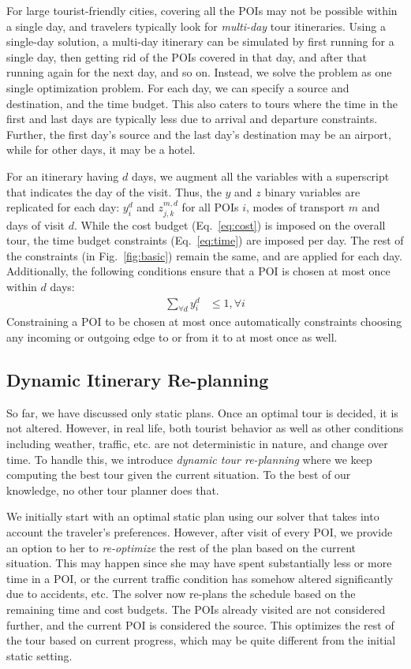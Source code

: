 For large tourist-friendly cities, covering all the POIs may not be
possible within a single day, and travelers typically look for
\emph{multi-day} tour itineraries.
Using a single-day solution, a multi-day itinerary can be simulated
by first
running for a single day, then getting rid of the POIs covered in that day, and
after that running again for the next day, and so on.
Instead, we solve the
problem as one single optimization problem.  For each day, we can specify a
source and destination, and the time budget.  This also caters to tours where
the time in the first and last days are typically less due to arrival and
departure constraints.  Further, the first day's source and the last day's
destination may be an airport, while for other days, it
may be a hotel.

For an itinerary having $d$ days, we augment all the variables with a
superscript that indicates the day of the visit.  Thus, the $y$ and $z$
binary variables are replicated for each day: $y^d_i$ and $z^{m,d}_{j,k}$
for all POIs $i$, modes of transport $m$ and days of visit $d$.  While the
cost budget (Eq.~\eqref{eq:cost}) is imposed on the overall tour, the time
budget constraints (Eq.~\eqref{eq:time}) are imposed per day.  The rest of
the constraints (in Fig.~\ref{fig:basic})
remain the same, and are applied for each day.  Additionally, the following
conditions ensure that a POI is chosen at most once within $d$ days:
%
\begin{align}
	\label{eq:multiday}
	\sum_{\forall d} y^d_i & \leq 1, \forall i
\end{align}
%
Constraining a POI to be chosen at most once automatically constraints choosing any incoming
or outgoing edge to or from it to at most once as well.

\subsection{Dynamic Itinerary Re-planning}
\label{sec:dynamic}

So far, we have discussed only static plans.
Once an optimal tour is decided, it is not altered.
However, in real life, both tourist behavior as well as other conditions including weather, traffic, etc. are not deterministic in nature, and change over time.
To handle this, we introduce \emph{dynamic tour re-planning} where we keep computing the best tour given the current situation.
To the best of our knowledge, no other tour planner does that.

We initially start with an optimal static plan using our solver that takes into account the traveler's preferences.
However, after visit of every POI, we provide an option to her to \emph{re-optimize} the rest of the plan based on the current situation.
This may happen since she may have spent substantially less or more time in a POI, or the current traffic condition has somehow altered significantly due to accidents, etc.
%
The \trip solver now re-plans the schedule based on the remaining time and cost
budgets. The POIs already visited are not considered further, and the current POI is considered the source.
This optimizes the rest of the tour based on current progress, which may be quite different from the initial
static setting.


